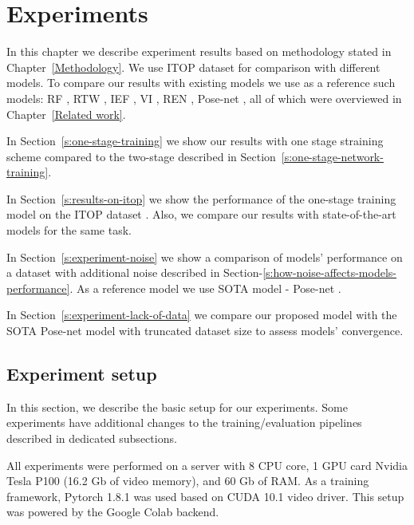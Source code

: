 \chapter{Experiments}
\label{Experiments}

In this chapter we describe experiment results based on methodology stated in Chapter~\ref{Methodology}. We use ITOP dataset \parencite{haque_towards_2016} for comparison with different models. To compare our results with existing models we use as a reference such models: RF \parencite{shotton_real-time_2011}, RTW \parencite{ho_yub_jung_random_2015}, IEF \parencite{carreira_human_2016}, VI \parencite{haque_towards_2016}, REN \parencite{chen_pose_2020}, Pose-net \parencite{moon_v2v-posenet_2018}, all of which were overviewed in Chapter~\ref{Related work}.

In Section~\ref{s:one-stage-training} we show our results with one stage straining scheme compared to the two-stage described in Section~\ref{s:one-stage-network-training}.

In Section~\ref{s:results-on-itop} we show the performance of the one-stage training model on the ITOP dataset \parencite{haque_towards_2016}. Also, we compare our results with state-of-the-art models for the same task.

In Section~\ref{s:experiment-noise} we show a comparison of models' performance on a dataset with additional noise described in Section-\ref{s:how-noise-affects-models-performance}. As a reference model we use SOTA model - Pose-net \parencite{moon_v2v-posenet_2018}.

In Section~\ref{s:experiment-lack-of-data} we compare our proposed model with the SOTA Pose-net model with truncated dataset size to assess models' convergence.

\section{Experiment setup}
\label{s:experiment-setup}
In this section, we describe the basic setup for our experiments. Some experiments have additional changes to the training/evaluation pipelines described in dedicated subsections.

All experiments were performed on a server with 8 CPU core, 1 GPU card Nvidia Tesla P100 (16.2 Gb of video memory), and 60 Gb of RAM. As a training framework, Pytorch 1.8.1 was used based on CUDA 10.1 video driver. This setup was powered by the Google Colab backend.

